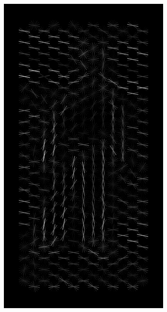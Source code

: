 \documentclass[thesis.tex]{subfiles}
\begin{document}
\begin{figure}
	\begin{subfigure}[t]{0.3\textwidth}
		\includegraphics[width=\textwidth]{img/inriaExampleDescriptor.pdf}
		\caption{}
		\label{fig:inriaExampleDescriptor}
		\vspace{2mm}
	\end{subfigure}
	\begin{subfigure}[t]{0.3\textwidth}

\end{subfigure}
\end{figure}
\end{document}
